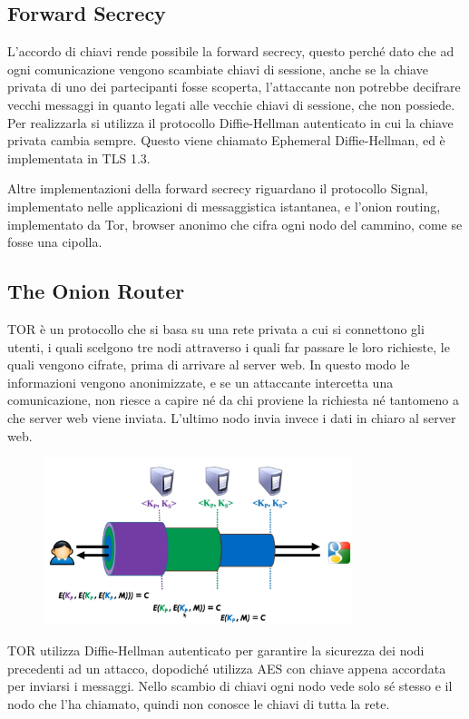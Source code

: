\subsection{Forward Secrecy}
L'accordo di chiavi rende possibile la forward secrecy, questo perché dato che ad ogni comunicazione vengono scambiate chiavi di sessione, anche se la chiave privata di uno dei partecipanti fosse scoperta, l'attaccante non potrebbe decifrare vecchi messaggi in quanto legati alle vecchie chiavi di sessione, che non possiede. Per realizzarla si utilizza il protocollo Diffie-Hellman autenticato in cui la chiave privata cambia sempre. Questo viene chiamato Ephemeral Diffie-Hellman, ed è implementata in TLS 1.3. 

Altre implementazioni della forward secrecy riguardano il protocollo Signal, implementato nelle applicazioni di messaggistica istantanea, e l'onion routing, implementato da Tor, browser anonimo che cifra ogni nodo del cammino, come se fosse una cipolla.

\subsection{The Onion Router}
TOR è un protocollo che si basa su una rete privata a cui si connettono gli utenti, i quali scelgono tre nodi attraverso i quali far passare le loro richieste, le quali vengono cifrate, prima di arrivare al server web. In questo modo le informazioni vengono anonimizzate, e se un attaccante intercetta una comunicazione, non riesce a capire né da chi proviene la richiesta né tantomeno a che server web viene inviata. L'ultimo nodo invia invece i dati in chiaro al server web.

\begin{figure}[htb!]
    \centering
    \includegraphics[width=9cm]{./Images/cap1/1.51.png}
\end{figure} 

TOR utilizza Diffie-Hellman autenticato per garantire la sicurezza dei nodi precedenti ad un attacco, dopodiché utilizza AES con chiave appena accordata per inviarsi i messaggi. Nello scambio di chiavi ogni nodo vede solo sé stesso e il nodo che l'ha chiamato, quindi non conosce le chiavi di tutta la rete.

